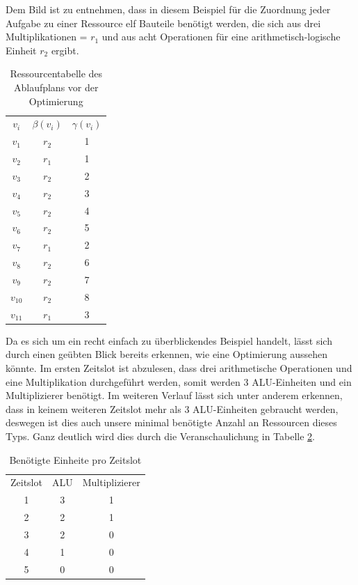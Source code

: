 \documentclass[conference]{IEEEtran}
\begin{document}
Dem Bild ist zu entnehmen, dass in diesem Beispiel für die Zuordnung jeder Aufgabe zu einer Ressource elf Bauteile benötigt werden, die sich aus drei Multiplikationen = $r_1$ und aus acht Operationen für eine arithmetisch-logische Einheit $r_2$ ergibt.\\
\begin{table}[h]
\caption{Ressourcentabelle des Ablaufplans vor der Optimierung}
\label{tab.3}
 \begin{center}
\begin{tabular}[h]{ccc}
$v_i$&$\beta(v_i)$&$\gamma(v_i)$\\
$v_1$&$r_2$&1\\
$v_2$&$r_1$&1\\
$v_3$&$r_2$&2\\
$v_4$&$r_2$&3\\
$v_5$&$r_2$&4\\
$v_6$&$r_2$&5\\
$v_7$&$r_1$&2\\
$v_8$&$r_2$&6\\
$v_9$&$r_2$&7\\
$v_10$&$r_2$&8\\
$v_11$&$r_1$&3\\
\end{tabular}
\end{center}
\end{table}
Da es sich um ein recht einfach zu überblickendes Beispiel handelt, lässt sich durch einen geübten Blick bereits erkennen, wie eine Optimierung aussehen könnte. Im ersten Zeitslot ist abzulesen, dass drei arithmetische Operationen und eine Multiplikation durchgeführt werden, somit werden 3 ALU-Einheiten und ein Multiplizierer benötigt. Im weiteren Verlauf lässt sich unter anderem erkennen, dass in keinem weiteren Zeitslot mehr als 3 ALU-Einheiten gebraucht werden, deswegen ist dies auch unsere minimal benötigte Anzahl an Ressourcen dieses Typs. Ganz deutlich wird dies durch die Veranschaulichung in  Tabelle \ref{tab.4}.\\
\begin{table}[h]
\caption{Benötigte Einheite pro Zeitslot}
\label{tab.4}
\begin{center}
\begin{tabular}[h]{ccc}
Zeitslot&ALU&Multiplizierer\\
1&3&1\\
2&2&1\\
3&2&0\\
4&1&0\\
5&0&0\\
\end{tabular}
\end{center}
\end{table}
\end{document}
